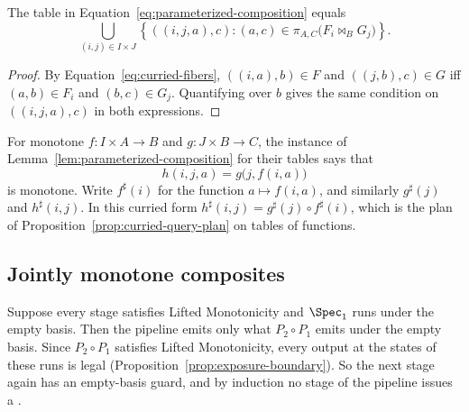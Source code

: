 \begin{proposition}
\label{prop:curried-query-plan}
The table in Equation~\ref{eq:parameterized-composition} equals
\begin{equation}
  \bigcup_{(i,j)\in I\times J}
  \left\{((i,j,a),c):
    (a,c)\in\pi_{A,C}\bigl(F_i\Join_B G_j\bigr)\right\}.
  \label{eq:curried-query-plan}
\end{equation}
\end{proposition}

\begin{proof}
By Equation~\ref{eq:curried-fibers}, $((i,a),b)\in F$ and $((j,b),c)\in G$
iff $(a,b)\in F_i$ and $(b,c)\in G_j$.  Quantifying over $b$ gives the same
condition on $((i,j,a),c)$ in both expressions.
\end{proof}

For monotone $f:I\times A\to B$ and $g:J\times B\to C$, the instance of
Lemma~\ref{lem:parameterized-composition} for their tables says that
\begin{equation}
  h(i,j,a)=g\bigl(j,f(i,a)\bigr)
  \label{eq:curried-composition}
\end{equation}
is monotone.  Write $f^\sharp(i)$ for the function $a\mapsto f(i,a)$, and
similarly $g^\sharp(j)$ and $h^\sharp(i,j)$.  In this curried form
$h^\sharp(i,j)=g^\sharp(j)\circ f^\sharp(i)$, which is the plan of
Proposition~\ref{prop:curried-query-plan} on tables of functions.

\subsection{Jointly monotone composites}

Suppose every stage satisfies Lifted Monotonicity and $\Spec_1$ runs under
the empty basis.  Then the pipeline emits only what $P_2\circ P_1$ emits under
the empty basis.  Since $P_2\circ P_1$ satisfies Lifted Monotonicity, every
output at the states of these runs is legal
(Proposition~\ref{prop:exposure-boundary}).  So the next stage again has an
empty-basis guard, and by induction no stage of the pipeline issues a
\commitment.

